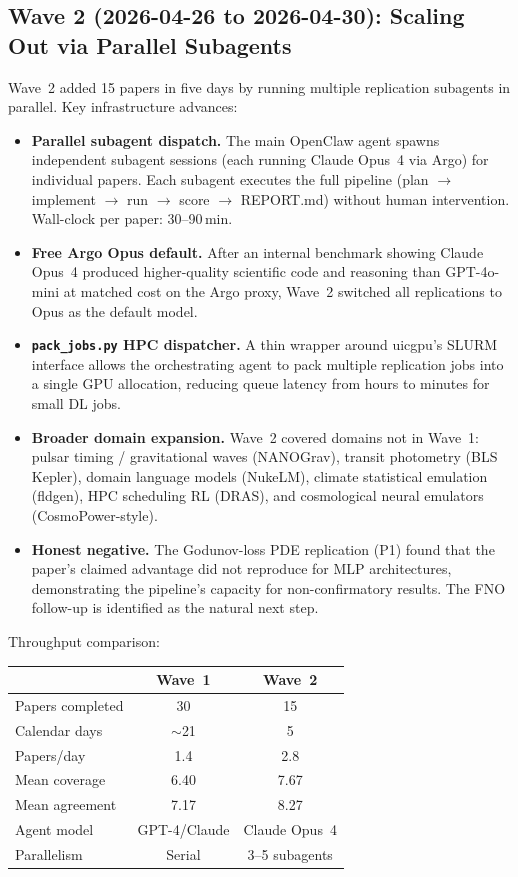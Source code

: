 \documentclass[11pt]{article}
\begin{document}
\subsection{Wave 2 (2026-04-26 to 2026-04-30): Scaling Out via Parallel Subagents}
Wave~2 added 15 papers in five days by running multiple replication subagents
in parallel. Key infrastructure advances:

\begin{itemize}
\item \textbf{Parallel subagent dispatch.} The main OpenClaw agent spawns
independent subagent sessions (each running Claude Opus~4 via Argo) for
individual papers. Each subagent executes the full pipeline
(plan $\to$ implement $\to$ run $\to$ score $\to$ REPORT.md) without
human intervention. Wall-clock per paper: 30--90\,min.
\item \textbf{Free Argo Opus default.} After an internal benchmark showing
Claude Opus~4 produced higher-quality scientific code and reasoning than
GPT-4o-mini at matched cost on the Argo proxy, Wave~2 switched all
replications to Opus as the default model.
\item \textbf{\texttt{pack\_jobs.py} HPC dispatcher.} A thin wrapper
around uicgpu's SLURM interface allows the orchestrating agent to pack
multiple replication jobs into a single GPU allocation, reducing queue
latency from hours to minutes for small DL jobs.
\item \textbf{Broader domain expansion.} Wave~2 covered domains not in
Wave~1: pulsar timing / gravitational waves (NANOGrav), transit photometry
(BLS Kepler), domain language models (NukeLM), climate statistical
emulation (fldgen), HPC scheduling RL (DRAS), and cosmological neural
emulators (CosmoPower-style).
\item \textbf{Honest negative.} The Godunov-loss PDE replication (P1)
found that the paper's claimed advantage did not reproduce for MLP
architectures, demonstrating the pipeline's capacity for non-confirmatory
results. The FNO follow-up is identified as the natural next step.
\end{itemize}

\noindent Throughput comparison:
\begin{center}
\begin{tabular}{lcc}\toprule
 & Wave~1 & Wave~2 \\\midrule
Papers completed & 30 & 15 \\
Calendar days & $\sim$21 & 5 \\
Papers/day & 1.4 & 2.8 \\
Mean coverage & 6.40 & 7.67 \\
Mean agreement & 7.17 & 8.27 \\
Agent model & GPT-4/Claude & Claude Opus~4 \\
Parallelism & Serial & 3--5 subagents \\\bottomrule
\end{tabular}
\end{center}
\end{document}
